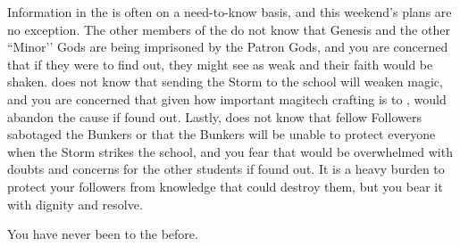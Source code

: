 \documentclass[char]{GL2020}
\begin{document}
\begin{itemz}[Notes]
    \item Information in the \pGoaties{} is often on a need-to-know basis, and this weekend’s plans are no exception. The other members of the \pGoaties{} do not know that Genesis and the other ``Minor’’ Gods are being imprisoned by the Patron Gods, and you are concerned that if they were to find out, they might see \cGenesis{} as weak and their faith would be shaken. \cChupInventor{} does not know that sending the Storm to the school will weaken magic, and you are concerned that given how important magitech crafting is to \cChupInventor{\them}, \cChupInventor{\they} would abandon the cause if \cChupInventor{\they} found out. Lastly, \cChupStudent{} does not know that \cChupstudent{\their} fellow Followers sabotaged the Bunkers or that the Bunkers will be unable to protect everyone when the Storm strikes the school, and you fear that \cChupStudent{\they} would be overwhelmed with doubts and concerns for the other students if \cChupStudent{\they} found out. It is a heavy burden to protect your followers from knowledge that could destroy them, but you bear it with dignity and resolve.
    \item You have never been to the \pSchool{} before.
\end{itemz}
\end{document}
